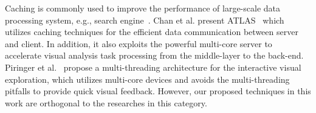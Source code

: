 Caching is commonly used to improve the performance of large-scale data processing system, e.g., search engine~\cite{xu2015diversified}.
Chan et al. present ATLAS~\cite{chan2008maintaining} which utilizes caching techniques for the efficient data communication between server and client.
In addition, it also exploits the powerful multi-core server to accelerate visual analysis task processing from the middle-layer to the back-end.
Piringer et al.~\cite{piringer2009multi} propose a multi-threading architecture for the interactive visual exploration,
which utilizes multi-core devices and avoids the multi-threading pitfalls to provide quick visual feedback.
However, our proposed techniques in this work are orthogonal to the researches in this category.



